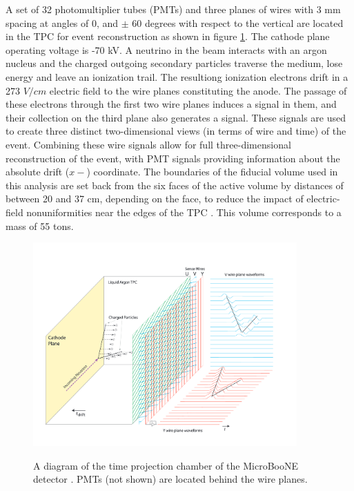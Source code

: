 \documentclass[a4paper,11pt]{article}
\begin{document}
A set of 32 photomultiplier tubes (PMTs) and three planes of wires with 3 mm spacing at angles of 0, and $\pm$ 60 degrees with respect to the vertical are located in the TPC for event reconstruction as shown in figure \ref{detector_fig}. The cathode plane operating voltage is -70 kV. A neutrino in the beam interacts with an argon nucleus and the charged outgoing secondary particles traverse the medium, lose energy and leave an ionization trail. The resultiong ionization electrons drift in a 273 $V/cm$ electric field to the wire planes constituting the anode. The passage of these electrons through the first two wire planes induces a signal in them, and their collection on the third plane also generates a signal. These signals are used to create three distinct two-dimensional views (in terms of wire and time) of the event. Combining these wire signals allow for full three-dimensional reconstruction of the event, with PMT signals providing information about the absolute drift ($x-$) coordinate. The boundaries of the fiducial volume used in this analysis are set back from the six faces of the active volume by distances of between 20 and 37 cm, depending on the face, to reduce the impact of electric-field nonuniformities near the edges of the TPC \cite{SCE_publicnote}. This volume corresponds to a mass of 55 tons.\\

\begin{figure}[ht!]
\centering
	\includegraphics[width=0.9\textwidth]{Figures/static_figs/detector2.png} \\
\caption{A diagram of the time projection chamber of the MicroBooNE detector \cite{ub_detectorpaper}. PMTs (not shown) are located behind the wire planes.}\label{detector_fig}
\end{figure}
\end{document}

